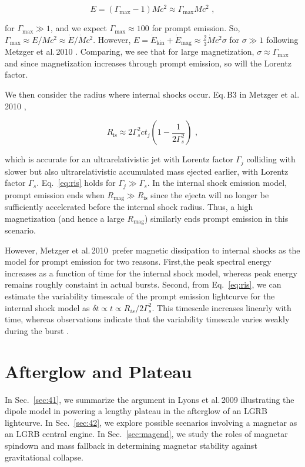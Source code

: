 \documentclass{article}
\begin{document}
\begin{equation} E = (\Gamma_{\mathrm{max}}-1) M c^2 \approx \Gamma_{\mathrm{max}} M c^2 \,\,,
\end{equation}

for $\Gamma_{\mathrm{max}} \gg 1$, and we expect $\Gamma_{\mathrm{max}}\approx 100$ for prompt emission. So, $\Gamma_{\mathrm{max}} \approx E/{M c^2} \approx \dot{E}/\dot{M} c^2$. However, $E=\dot{E}_{\mathrm{kin}}+\dot{E}_{\mathrm{mag}} \approx \frac{2}{3} \dot{M} c^2 \sigma$ for $\sigma \gg 1$ following Metzger et al.\,2010 \cite{Metzger:2010pp}. Comparing, we see that for large magnetization, $\sigma \approx \Gamma_{\mathrm{max}}$ and since magnetization increases through prompt emission, so will the Lorentz factor.

We then consider the radius where internal shocks occur. Eq.\,B3 in Metzger et al.\,2010 \cite{Metzger:2010pp},

\begin{equation}\label{eq:ris}
R_{\mathrm{is}} \approx 2\Gamma_s^2 c t_j\left(1-\frac{1}{2\Gamma_s^2}\right)\,\,,
\end{equation}

which is accurate for an ultrarelativistic jet with Lorentz factor $\Gamma_j$ colliding with slower but also ultrarelativistic accumulated mass ejected earlier, with Lorentz factor $\Gamma_s$. Eq.~\ref{eq:ris} holds for $\Gamma_{j}\gg \Gamma_{s}$. In the internal shock emission model, prompt emission ends when $R_{\mathrm{mag}} \gg R_{\mathrm{is}}$ since the ejecta will no longer be sufficiently accelerated before the internal shock radius. Thus, a high magnetization (and hence a large $R_{\mathrm{mag}}$) similarly ends prompt emission in this scenario.

However, Metzger et al.\,2010\,\cite{Metzger:2010pp} prefer magnetic dissipation to internal shocks as the model for prompt emission for two reasons. First,the peak spectral energy increases as a function of time for the internal shock model, whereas peak energy remains roughly constaint in actual bursts. Second, from Eq.~\ref{eq:ris}, we can estimate the variability timescale of the prompt emission lightcurve for the internal shock model as $\delta t \propto t \propto R_{is}/2 \Gamma_s^2$. This timescale increases linearly with time, whereas observations indicate that the variability timescale varies weakly during the burst \cite{Fenimore:1999su}.

\section{Afterglow and Plateau} \label{sec:ag}
In Sec.~\ref{sec:41}, we summarize the argument in Lyons et al.\,2009 illustrating the dipole model in powering a lengthy plateau in the afterglow of an LGRB lightcurve. In Sec.~\ref{sec:42}, we explore possible scenarios involving a magnetar as an LGRB central engine. In Sec.~\ref{sec:magend}, we study the roles of magnetar spindown and mass fallback in determining magnetar stability against gravitational collapse.
\end{document}
